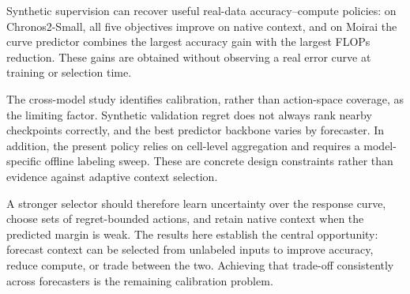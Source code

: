 Synthetic supervision can recover useful real-data accuracy--compute policies:
on Chronos2-Small, all five objectives improve on native context, and on Moirai
the curve predictor combines the largest accuracy gain with the largest FLOPs
reduction.  These gains are obtained without observing a real error curve at
training or selection time.

The cross-model study identifies calibration, rather than action-space
coverage, as the limiting factor.  Synthetic validation regret does not always
rank nearby checkpoints correctly, and the best predictor backbone varies by
forecaster.  In addition, the present policy relies on cell-level aggregation
and requires a model-specific offline labeling sweep.  These are concrete
design constraints rather than evidence against adaptive context selection.

A stronger selector should therefore learn uncertainty over the response
curve, choose sets of regret-bounded actions, and retain native context when
the predicted margin is weak.  The results here establish the central
opportunity: forecast context can be selected from unlabeled inputs to improve
accuracy, reduce compute, or trade between the two.  Achieving that trade-off
consistently across forecasters is the remaining calibration problem.
